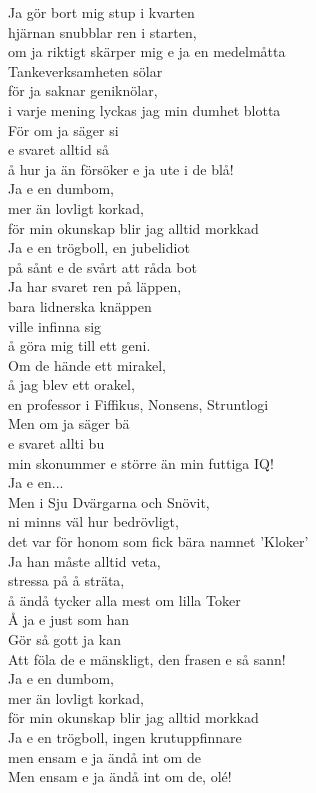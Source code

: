 \documentclass[12pt]{article}
\begin{document}
\noindent
\begin{minipage}{.475\textwidth}
	\noindent
	Ja gör bort mig stup i kvarten\\ hjärnan snubblar ren i starten,\\
	om ja riktigt skärper mig e ja en medelmåtta\\
	Tankeverksamheten sölar\\ för ja saknar geniknölar,\\
	i varje mening lyckas jag min dumhet blotta\\
	För om ja säger si\\
	e svaret alltid så\\
	å hur ja än försöker e ja ute i de blå!\\

	\noindent
	Ja e en dumbom,\\
	mer än lovligt korkad,\\
	för min okunskap blir jag alltid morkkad\\
	Ja e en trögboll, en jubelidiot\\
	på sånt e de svårt att råda bot\\

	\noindent
	Ja har svaret ren på läppen,\\ bara lidnerska knäppen\\
	ville infinna sig\\ å göra mig till ett geni.\\
	Om de hände ett mirakel,\\ å jag blev ett orakel,\\
	en professor i Fiffikus, Nonsens, Struntlogi\\
	Men om ja säger bä\\
	e svaret allti bu\\
	min skonummer e större än min futtiga IQ!\\

	Ja e en...\\
	
	\noindent
	Men i Sju Dvärgarna och Snövit,\\
	ni minns väl hur bedrövligt,\\
	det var för honom som fick bära namnet 'Kloker'\\
	Ja han måste alltid veta,\\
	stressa på å sträta,\\
	å ändå tycker alla mest om lilla Toker\\
	Å ja e just som han\\
	Gör så gott ja kan\\
	Att föla de e mänskligt, den frasen e så sann!\\
	
	Ja e en dumbom,\\
	mer än lovligt korkad,\\
	för min okunskap blir jag alltid morkkad\\
	Ja e en trögboll, ingen krutuppfinnare\\
	men ensam e ja ändå int om de\\
	Men ensam e ja ändå int om de, olé!
\end{minipage}%
\end{document}
